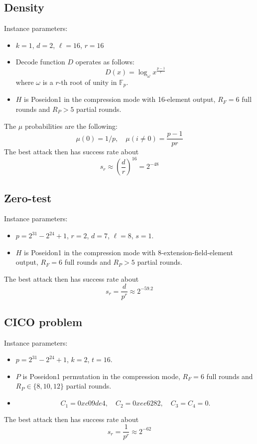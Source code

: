 \documentclass{article}
\begin{document}
\subsection{Density}

Instance parameters:
\begin{itemize}
    \item $k=1$, $d=2$, $\ell=16$, $r=16$
    \item $\mathrm{Decode}$ function $D$ operates as follows:
    $$
    D(x)=\log_{\omega} x^{\frac{p-1}{r}}
    $$
    where $\omega$ is a $r$-th root of unity in $\mathbb{F}_p$.
    \item $H$ is Poseidon1 in the compression mode with  16-element output, $R_F=6$ full rounds and $R_P>5$ partial rounds.
\end{itemize}

The $\mu$ probabilities are the following:
$$
\mu(0)=1/p,\quad \mu(i\neq 0) = \frac{p-1}{pr}
$$
The best attack then has success rate about
$$
s_r\approx \left(\frac{d}{r}\right)^{16}=2^{-48}
$$

\subsection{Zero-test}

Instance parameters:
\begin{itemize}
    \item $p=2^{31}-2^{24}+1$, $r=2$, $d=7$, $\ell=8$, $s=1$.
    \item $H$ is Poseidon1 in the compression mode with  8-extension-field-element output, $R_F=6$ full rounds and $R_P>5$ partial rounds.
\end{itemize}
The best attack then has success rate about
$$
s_r= \frac{d}{p^r}\approx 2^{-59.2}
$$


\subsection{CICO problem}
Instance parameters:
\begin{itemize}
    \item $p=2^{31}-2^{24}+1$, $k=2$, $t=16$.
    \item $P$ is Poseidon1 permutation in the compression mode,
     $R_F=6$ full rounds and $R_P\in\{8,10,12\}$ partial rounds.
     \item
     $$
     C_1=0xc09de4,\quad C_2=0xee6282,\quad C_3=C_4 = 0.
     $$
\end{itemize}
The best attack then has success rate about
$$
s_r= \frac{1}{p^r}\approx 2^{-62}
$$
\end{document}
